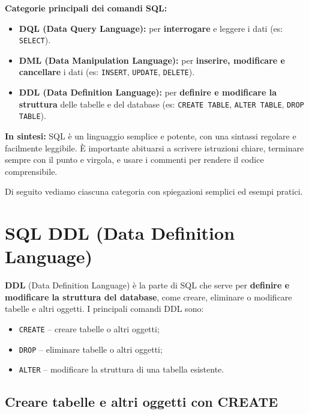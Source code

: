 \documentclass[a4paper,12pt]{article}
\newcommand{\code}[1]{\texttt{#1}}
\begin{document}
\textbf{Categorie principali dei comandi SQL:}
\begin{itemize}
    \item \textbf{DQL (Data Query Language):} per \textbf{interrogare} e leggere i dati (es: \code{SELECT}).
    \item \textbf{DML (Data Manipulation Language):} per \textbf{inserire, modificare e cancellare} i dati (es: \code{INSERT}, \code{UPDATE}, \code{DELETE}).
    \item \textbf{DDL (Data Definition Language):} per \textbf{definire e modificare la struttura} delle tabelle e del database (es: \code{CREATE TABLE}, \code{ALTER TABLE}, \code{DROP TABLE}).
\end{itemize}

\textbf{In sintesi:}  
SQL è un linguaggio semplice e potente, con una sintassi regolare e facilmente leggibile. È importante abituarsi a scrivere istruzioni chiare, terminare sempre con il punto e virgola, e usare i commenti per rendere il codice comprensibile.

\medskip
Di seguito vediamo ciascuna categoria con spiegazioni semplici ed esempi pratici.







\newpage
\section{SQL DDL (Data Definition Language)}

\textbf{DDL} (Data Definition Language) è la parte di SQL che serve per \textbf{definire e modificare la struttura del database}, come creare, eliminare o modificare tabelle e altri oggetti.  
I principali comandi DDL sono:

\begin{itemize}
    \item \code{CREATE} -- creare tabelle o altri oggetti;
    \item \code{DROP} -- eliminare tabelle o altri oggetti;
    \item \code{ALTER} -- modificare la struttura di una tabella esistente.
\end{itemize}

\subsection{Creare tabelle e altri oggetti con CREATE}
\end{document}

